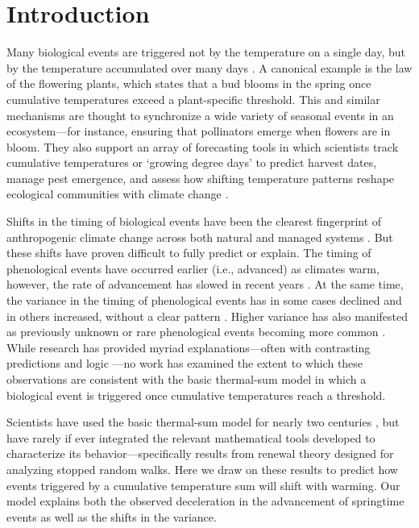\documentclass[
]{article}
\begin{document}
\section{Introduction}\label{introduction}

Many biological events are triggered not by the temperature on a single day, but by the temperature accumulated over many days \citep{larcher1980}. A canonical example is the law of the flowering plants, which states that a bud blooms in the spring once cumulative temperatures exceed a plant-specific threshold. This and similar mechanisms are thought to synchronize a wide variety of seasonal events in an ecosystem---for instance, ensuring that pollinators emerge when flowers are in bloom. They also support an array of forecasting tools in which scientists track cumulative temperatures or `growing degree days' to predict harvest dates, manage pest emergence, and assess how shifting temperature patterns reshape ecological communities with climate change \citep{schwartzbook}.

Shifts in the timing of biological events have been the clearest fingerprint of anthropogenic climate change across both natural and managed systems \citep{ipcc2022}. But these shifts have proven difficult to fully predict or explain. The timing of phenological events have occurred earlier (i.e., advanced) as climates warm, however, the rate of advancement has slowed in recent years \citep{fu2015declining}.  At the same time, the variance in the timing of phenological events has in some cases declined and in others increased, without a clear pattern \citep{vitasse2018global,stemkovski2023disorder}. Higher variance has also manifested as previously unknown or rare phenological events becoming more common \citep{chuine2025living}. While research has provided myriad explanations---often with contrasting predictions and logic \citep{fu2015declining,wolkovich2021simple,gao2024thermal}---no work has examined the extent to which these observations are consistent with the basic thermal-sum model in which a biological event is triggered once cumulative temperatures reach a threshold.

Scientists have used the basic thermal-sum model for nearly two centuries \citep{quetelet1849letters}, but have rarely if ever integrated the relevant mathematical tools developed %
to characterize its behavior---specifically results from renewal theory designed for analyzing stopped random walks. %
 Here we draw on these results to predict how events triggered by a cumulative temperature sum will shift with warming. Our model explains both the observed deceleration in the advancement of springtime events as well as the shifts in the variance. 
\end{document}
